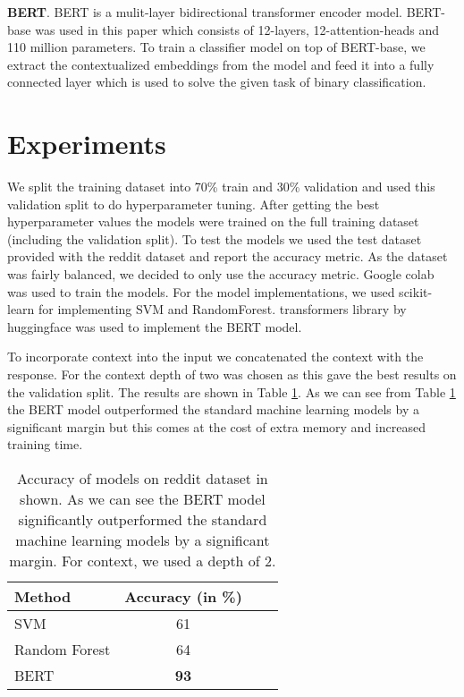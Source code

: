 \documentclass[10pt,twocolumn,letterpaper]{article}
\begin{document}
\textbf{BERT}. BERT is a mulit-layer bidirectional transformer encoder model. BERT-base was used in this paper which consists of 12-layers, 12-attention-heads and 110 million parameters. To train a classifier model on top of BERT-base, we extract the contextualized embeddings from the model and feed it into a fully connected layer which is used to solve the given task of binary classification.

\section{Experiments}
We split the training dataset into 70\% train and 30\% validation and used this validation split to do hyperparameter tuning. After getting the best hyperparameter values the models were trained on the full training dataset (including the validation split). To test the models we used the test dataset provided with the reddit dataset and report the accuracy metric. As the dataset was fairly balanced, we decided to only use the accuracy metric. Google colab was used to train the models. For the model implementations, we used scikit-learn for implementing SVM and RandomForest. transformers \cite{paper_15} library by huggingface was used to implement the BERT model.

To incorporate context into the input we concatenated the context with the response. For the context depth of two was chosen as this gave the best results on the validation split. The results are shown in Table \ref{table_01}. As we can see from Table \ref{table_01} the BERT model outperformed the standard machine learning models by a significant margin but this comes at the cost of extra memory and increased training time. 

\begin{table}
  \centering
  \begin{tabular}{@{}lc@{}lc@{}}
    \toprule
    Method & Accuracy (in \%) \\
    \midrule
    SVM & 61 \\
    Random Forest & 64 \\
    BERT & \textbf{93} \\
    \bottomrule
  \end{tabular}
  \caption{Accuracy of models on reddit dataset in shown. As we can see the BERT model significantly outperformed the standard machine learning models by a significant margin. For context, we used a depth of 2.}
  \label{table_01}
\end{table}
\end{document}
